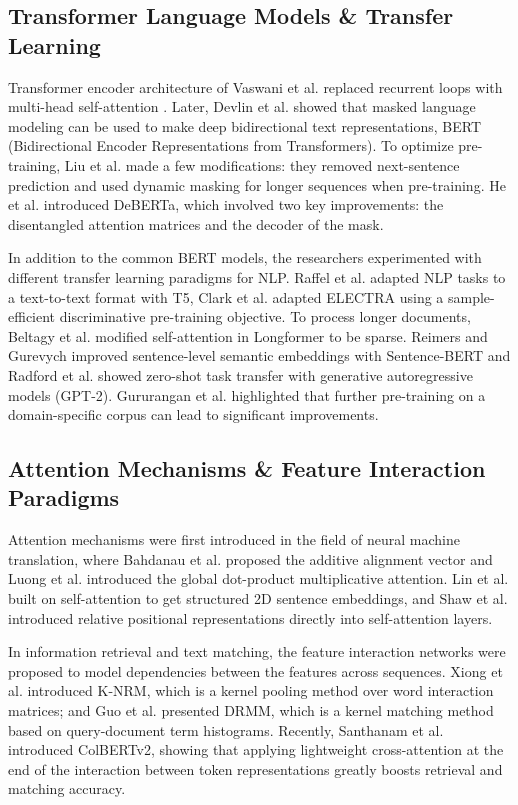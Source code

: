 \documentclass[11pt,a4paper]{article}
\begin{document}
\subsection{Transformer Language Models \& Transfer Learning}
Transformer encoder architecture of Vaswani et al. replaced recurrent loops with multi-head self-attention \cite{vaswani2017attention}. Later, Devlin et al. \cite{devlin2019bert} showed that masked language modeling can be used to make deep bidirectional text representations, BERT (Bidirectional Encoder Representations from Transformers). To optimize pre-training, Liu et al. \cite{liu2019roberta} made a few modifications: they removed next-sentence prediction and used dynamic masking for longer sequences when pre-training. He et al. \cite{he2021deberta} introduced DeBERTa, which involved two key improvements: the disentangled attention matrices and the decoder of the mask.

In addition to the common BERT models, the researchers experimented with different transfer learning paradigms for NLP. Raffel et al. \cite{raffel2020exploring} adapted NLP tasks to a text-to-text format with T5, Clark et al. \cite{clark2020electra} adapted ELECTRA using a sample-efficient discriminative pre-training objective. To process longer documents, Beltagy et al. \cite{beltagy2020longformer} modified self-attention in Longformer to be sparse. Reimers and Gurevych \cite{reimers2019sentence} improved sentence-level semantic embeddings with Sentence-BERT and Radford et al. \cite{radford2019language} showed zero-shot task transfer with generative autoregressive models (GPT-2). Gururangan et al. \cite{gururangan2020dont} highlighted that further pre-training on a domain-specific corpus can lead to significant improvements.

\subsection{Attention Mechanisms \& Feature Interaction Paradigms}
Attention mechanisms were first introduced in the field of neural machine translation, where Bahdanau et al. \cite{bahdanau2015neural} proposed the additive alignment vector and Luong et al. \cite{luong2015effective} introduced the global dot-product multiplicative attention. Lin et al. \cite{lin2017structured} built on self-attention to get structured 2D sentence embeddings, and Shaw et al. \cite{shaw2018self} introduced relative positional representations directly into self-attention layers.

In information retrieval and text matching, the feature interaction networks were proposed to model dependencies between the features across sequences. Xiong et al. \cite{xiong2017end} introduced K-NRM, which is a kernel pooling method over word interaction matrices; and Guo et al. \cite{guo2016deep} presented DRMM, which is a kernel matching method based on query-document term histograms. Recently, Santhanam et al. \cite{santhanam2022colbertv2} introduced ColBERTv2, showing that applying lightweight cross-attention at the end of the interaction between token representations greatly boosts retrieval and matching accuracy.
\end{document}
